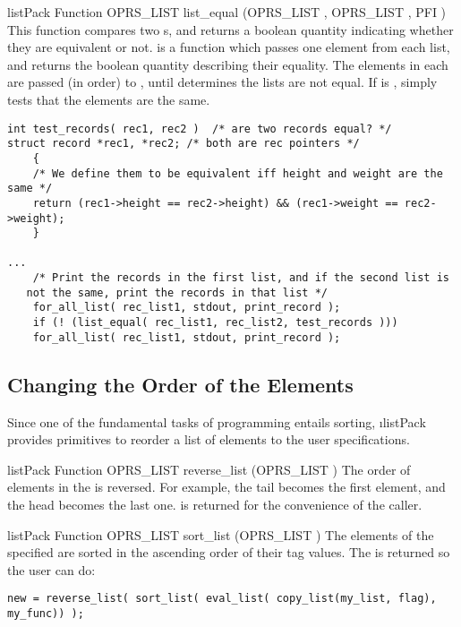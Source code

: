 \begin{typefn}{listPack Function} {OPRS\_LIST} {list\_equal} {(OPRS\_LIST , OPRS\_LIST
, PFI )}
This function compares two s, and returns a boolean quantity
indicating whether they are equivalent or not.   is a
function which passes one element from each list, and returns the boolean
quantity describing their equality.  The elements in each  are
passed (in order) to , until  determines the
lists are not equal.  If  is ,  simply
tests that the elements are the same.

\begin{verbatim}
int test_records( rec1, rec2 )  /* are two records equal? */
struct record *rec1, *rec2; /* both are rec pointers */
    {
    /* We define them to be equivalent iff height and weight are the same */
    return (rec1->height == rec2->height) && (rec1->weight == rec2->weight);
    }

...
    /* Print the records in the first list, and if the second list is
   not the same, print the records in that list */
    for_all_list( rec_list1, stdout, print_record );
    if (! (list_equal( rec_list1, rec_list2, test_records )))
    for_all_list( rec_list1, stdout, print_record );
\end{verbatim}
\end{typefn}

\subsection{Changing the Order of the Elements}

Since one of the fundamental tasks of programming entails sorting,
\i{listPack}
provides primitives to reorder a list of elements to the user
specifications.

\begin{typefn}{listPack Function} {OPRS\_LIST} {reverse\_list} {(OPRS\_LIST )}
The order of elements in the  is reversed. For example, the tail
becomes the first element, and the head becomes the last one.  is returned for the convenience of the caller.
\end{typefn}

\begin{typefn}{listPack Function} {OPRS\_LIST} {sort\_list} {(OPRS\_LIST )}
The elements of the specified  are sorted in the ascending order of
their tag values. The  is returned so the user can do:
\begin{verbatim}
new = reverse_list( sort_list( eval_list( copy_list(my_list, flag),
my_func)) );
\end{verbatim}
\end{typefn}

